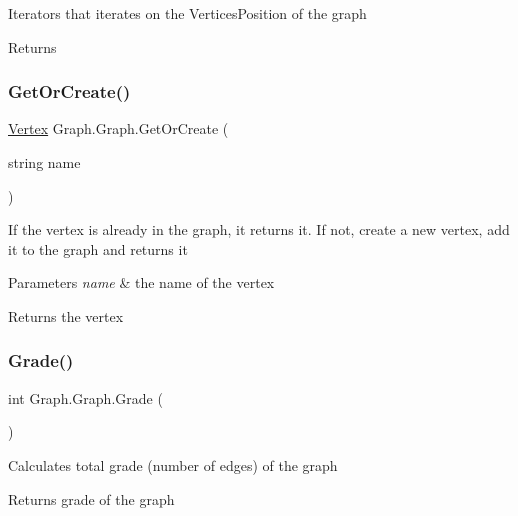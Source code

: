 Iterators that iterates on the Vertices\+Position of the graph 

\begin{DoxyReturn}{Returns}

\end{DoxyReturn}
\mbox{\label{class_graph_1_1_graph_ac68594326ba5c47cc44b0130bba6f924}} 
\subsubsection{\texorpdfstring{Get\+Or\+Create()}{GetOrCreate()}}
{\footnotesize\ttfamily \hyperlink{class_graph_1_1_vertex}{Vertex} Graph.\+Graph.\+Get\+Or\+Create (\begin{DoxyParamCaption}\item[{string}]{name }\end{DoxyParamCaption})}



If the vertex is already in the graph, it returns it. If not, create a new vertex, add it to the graph and returns it 


\begin{DoxyParams}{Parameters}
{\em name} & the name of the vertex\\
\hline
\end{DoxyParams}
\begin{DoxyReturn}{Returns}
the vertex
\end{DoxyReturn}
\mbox{\label{class_graph_1_1_graph_a1340be74165a617b2229a1ddb6acb9d2}} 
\subsubsection{\texorpdfstring{Grade()}{Grade()}}
{\footnotesize\ttfamily int Graph.\+Graph.\+Grade (\begin{DoxyParamCaption}{ }\end{DoxyParamCaption})}



Calculates total grade (number of edges) of the graph 

\begin{DoxyReturn}{Returns}
grade of the graph
\end{DoxyReturn}
\mbox{\label{class_graph_1_1_graph_a7704d6b3b279e38356b1a3a75f1b4b92}} 
